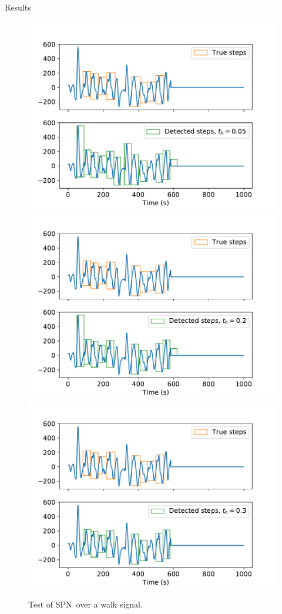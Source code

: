 \documentclass[8pt,t,aspectratio=1610]{beamer}
\newcommand{\subalgo}{{\small\textsc{SPN}}\ }
\begin{document}
\begin{frame}{Results}
\begin{figure}[h]
    \begin{overprint}
        \centering\includegraphics[width=0.75\linewidth]{Mercredi_10_19_13_00_to_10_19_18_85_th_005.pdf}
        \centering\includegraphics[width=0.75\linewidth]{Mercredi_10_19_13_00_to_10_19_18_85_th_02.pdf}
        \centering\includegraphics[width=0.75\linewidth]{Mercredi_10_19_13_00_to_10_19_18_85_th_03.pdf}
    \end{overprint}
    \caption{Test of \subalgo over a walk signal.}
\end{figure}
\end{frame}
\end{document}
